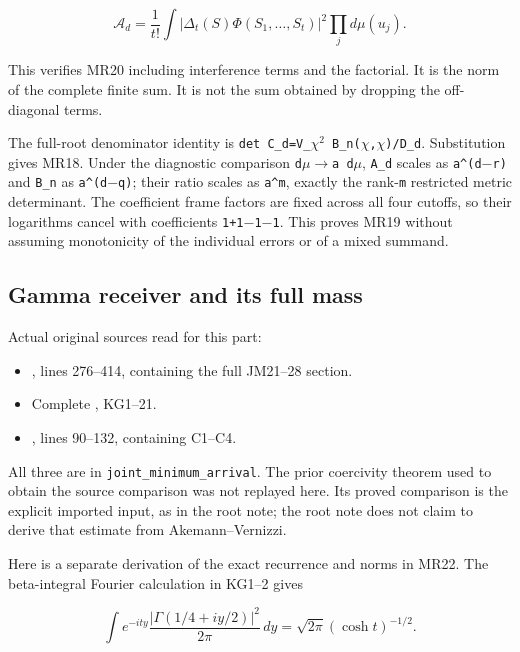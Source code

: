 \documentclass[11pt]{article}
\begin{document}
\[
\mathcal A_d=\frac1{t!}\int|\Delta_t(S)\Phi(S_1,\ldots,S_t)|^2
\prod_jd\mu(u_j).
\]

This verifies MR20 including interference terms and the factorial. It is the norm of the complete finite sum. It is not the sum obtained by dropping the off-diagonal terms.

The full-root denominator identity is \texttt{det\ C\_d=\textbar{}V\_\ensuremath{\chi}\textbar{}\ensuremath{{}^2}\ B\_n(\ensuremath{\chi},\ensuremath{\chi})/D\_d}. Substitution gives MR18. Under the diagnostic comparison \texttt{d\ensuremath{\mu}\ensuremath{\to}a\ d\ensuremath{\mu}}, \texttt{A\_d} scales as \texttt{a\^{}(d\ensuremath{-}r)} and \texttt{B\_n} as \texttt{a\^{}(d\ensuremath{-}q)}; their ratio scales as \texttt{a\^{}m}, exactly the rank-\texttt{m} restricted metric determinant. The coefficient frame factors are fixed across all four cutoffs, so their logarithms cancel with coefficients \texttt{1+1\ensuremath{-}1\ensuremath{-}1}. This proves MR19 without assuming monotonicity of the individual errors or of a mixed summand.

\subsection{Gamma receiver and its full mass}\label{mrreview:gamma-receiver-and-its-full-mass}

Actual original sources read for this part:

\begin{itemize}
\mrreviewtightlist
\item
  , lines 276--414, containing the full JM21--28 section.
\item
  Complete , KG1--21.
\item
  , lines 90--132, containing C1--C4.
\end{itemize}

All three are in \texttt{joint\_minimum\_arrival}. The prior coercivity theorem used to obtain the source comparison was not replayed here. Its proved comparison is the explicit imported input, as in the root note; the root note does not claim to derive that estimate from Akemann--Vernizzi.

Here is a separate derivation of the exact recurrence and norms in MR22. The beta-integral Fourier calculation in KG1--2 gives

\[
\int e^{-ity}\frac{|\Gamma(1/4+iy/2)|^2}{2\pi}\,dy
=\sqrt{2\pi}(\cosh t)^{-1/2}.
\]
\end{document}
